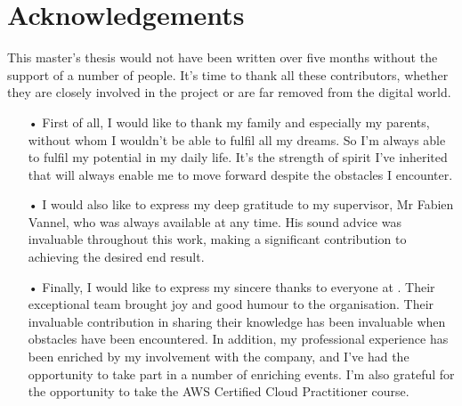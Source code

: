 
\chapter*{Acknowledgements}


This master's thesis would not have been written over five months without the support of a number of people. It's time to thank all these contributors, whether they are closely involved in the project or are far removed from the digital world.

\begin{itemize}
    \item [•] First of all, I would like to thank my family and especially my parents, without whom I wouldn't be able to fulfil all my dreams. So I'm always able to fulfil my potential in my daily life. It's the strength of spirit I've inherited that will always enable me to move forward despite the obstacles I encounter.
    \item [•] I would also like to express my deep gratitude to my supervisor, Mr Fabien Vannel, who was always available at any time. His sound advice was invaluable throughout this work, making a significant contribution to achieving the desired end result.
    \item [•] Finally, I would like to express my sincere thanks to everyone at . Their exceptional team brought joy and good humour to the organisation. Their invaluable contribution in sharing their knowledge has been invaluable when obstacles have been encountered. In addition, my professional experience has been enriched by my involvement with the company, and I've had the opportunity to take part in a number of enriching events. I'm also grateful for the opportunity to take the AWS Certified Cloud Practitioner course.
\end{itemize}